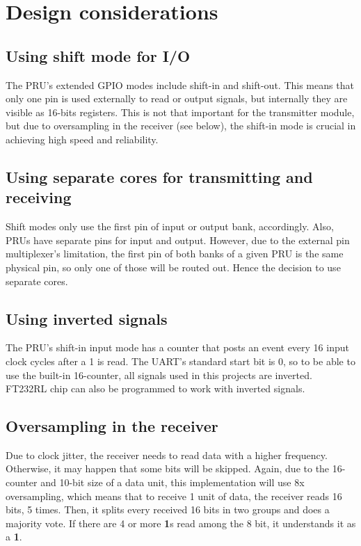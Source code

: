 \documentclass[a4,11pt]{article}
\begin{document}
\section{Design considerations}

 \subsection{Using shift mode for I/O}
 The PRU's extended GPIO modes include shift-in and shift-out. This means that only one pin is used externally to read or output signals, but internally they are visible as 16-bits registers. This is not that important for the transmitter module, but due to oversampling in the receiver (see below), the shift-in mode is crucial in achieving high speed and reliability.

 \subsection{Using separate cores for transmitting and receiving}
 Shift modes only use the first pin of input or output bank, accordingly.
 Also, PRUs have separate pins for input and output.
 However, due to the external pin multiplexer's limitation, the first pin of both banks of a given PRU is the same physical pin, so only one of those will be routed out. Hence the decision to use separate cores.

 \subsection{Using inverted signals}
 The PRU's shift-in input mode has a counter that posts an event every 16 input clock cycles after a 1 is read.
 The UART's standard start bit is 0, so to be able to use the built-in 16-counter, all signals used in this projects are inverted. FT232RL chip can also be programmed to work with inverted signals.

 \subsection{Oversampling in the receiver}
 Due to clock jitter, the receiver needs to read data with a higher frequency. Otherwise, it may happen that some bits will be skipped. Again, due to the 16-counter and 10-bit size of a data unit, this implementation will use 8x oversampling, which means that to receive 1 unit of data, the receiver reads 16 bits, 5 times. Then, it splits every received 16 bits in two groups and does a majority vote. If there are 4 or more \textbf{1}s read among the 8 bit, it understands it as a \textbf{1}.
\end{document}
